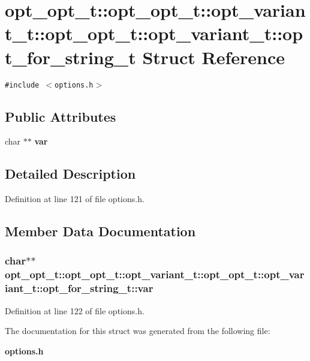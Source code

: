 \section{opt\_\-opt\_\-t::opt\_\-opt\_\-t::opt\_\-variant\_\-t::opt\_\-opt\_\-t::opt\_\-variant\_\-t::opt\_\-for\_\-string\_\-t Struct Reference}
\label{structopt__opt__t_1_1opt__variant__t_1_1opt__for__string__t}
{\tt \#include $<$options.h$>$}

\subsection*{Public Attributes}
\begin{CompactItemize}
\item 
char $\ast$$\ast$ {\bf var}
\end{CompactItemize}


\subsection{Detailed Description}


Definition at line 121 of file options.h.

\subsection{Member Data Documentation}
\subsubsection[{var}]{\setlength{\rightskip}{0pt plus 5cm}char$\ast$$\ast$ opt\_\-opt\_\-t::opt\_\-opt\_\-t::opt\_\-variant\_\-t::opt\_\-opt\_\-t::opt\_\-variant\_\-t::opt\_\-for\_\-string\_\-t::var}\label{structopt__opt__t_1_1opt__variant__t_1_1opt__for__string__t_802bc7e892b07274f6804795d6e07dd5}




Definition at line 122 of file options.h.

The documentation for this struct was generated from the following file:\begin{CompactItemize}
\item 
{\bf options.h}\end{CompactItemize}
